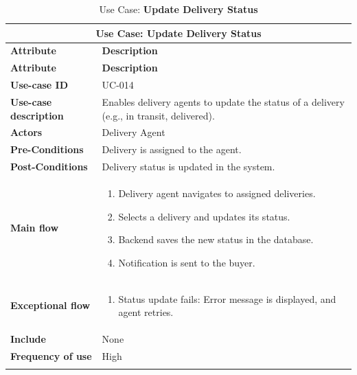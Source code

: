 \documentclass[12pt]{report}
\begin{document}
\begin{appendices}
	\begin{longtable}[H]{|l|p{9cm}||}
		\hline
		\multicolumn{2}{|c||}{\textbf{Use Case: Update Delivery Status}}                                                          \\
		\hline
		\textbf{Attribute}            & \textbf{Description}                                                                      \\
		\hline
		\endfirsthead
		\hline
		\textbf{Attribute}            & \textbf{Description}                                                                      \\
		\hline
		\endhead
		\textbf{Use-case ID}          & UC-014                                                                                    \\
		\hline
		\textbf{Use-case description} & Enables delivery agents to update the status of a delivery (e.g., in transit, delivered). \\
		\hline
		\textbf{Actors}               & Delivery Agent                                                                            \\
		\hline
		\textbf{Pre-Conditions}       & Delivery is assigned to the agent.                                                        \\
		\hline
		\textbf{Post-Conditions}      & Delivery status is updated in the system.                                                 \\
		\hline
		\textbf{Main flow}            & \begin{enumerate}
			                                \item Delivery agent navigates to assigned deliveries.
			                                \item Selects a delivery and updates its status.
			                                \item Backend saves the new status in the database.
			                                \item Notification is sent to the buyer.
		                                \end{enumerate}                                     \\
		\hline
		\textbf{Exceptional flow}     & \begin{enumerate}
			                                \item Status update fails: Error message is displayed, and agent retries.
		                                \end{enumerate}                  \\
		\hline
		\textbf{Include}              & None                                                                                      \\
		\hline
		\textbf{Frequency of use}     & High                                                                                      \\
		\hline
		\hline
		\caption{Use Case: \textbf{Update Delivery Status}}\label{tab:tableUpdateStatus}
	\end{longtable}


\end{appendices}
\end{document}

